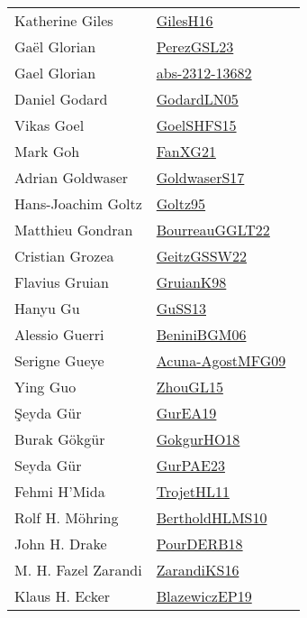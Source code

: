 {\begin{longtable}{p{4cm}p{20cm}}
Katherine Giles & \href{papers/GilesH16.pdf}{GilesH16}~\cite{GilesH16}\\
Ga{\"{e}}l Glorian & \href{papers/PerezGSL23.pdf}{PerezGSL23}~\cite{PerezGSL23}\\
Gael Glorian & \href{articles/abs-2312-13682.pdf}{abs-2312-13682}~\cite{abs-2312-13682}\\
Daniel Godard & \href{}{GodardLN05}~\cite{GodardLN05}\\
Vikas Goel & \href{articles/GoelSHFS15.pdf}{GoelSHFS15}~\cite{GoelSHFS15}\\
Mark Goh & \href{articles/FanXG21.pdf}{FanXG21}~\cite{FanXG21}\\
Adrian Goldwaser & \href{papers/GoldwaserS17.pdf}{GoldwaserS17}~\cite{GoldwaserS17}\\
Hans{-}Joachim Goltz & \href{papers/Goltz95.pdf}{Goltz95}~\cite{Goltz95}\\
Matthieu Gondran & \href{articles/BourreauGGLT22.pdf}{BourreauGGLT22}~\cite{BourreauGGLT22}\\
Cristian Grozea & \href{papers/GeitzGSSW22.pdf}{GeitzGSSW22}~\cite{GeitzGSSW22}\\
Flavius Gruian & \href{papers/GruianK98.pdf}{GruianK98}~\cite{GruianK98}\\
Hanyu Gu & \href{papers/GuSS13.pdf}{GuSS13}~\cite{GuSS13}\\
Alessio Guerri & \href{papers/BeniniBGM06.pdf}{BeniniBGM06}~\cite{BeniniBGM06}\\
Serigne Gueye & \href{papers/Acuna-AgostMFG09.pdf}{Acuna-AgostMFG09}~\cite{Acuna-AgostMFG09}\\
Ying Guo & \href{papers/ZhouGL15.pdf}{ZhouGL15}~\cite{ZhouGL15}\\
Şeyda G{\"u}r & \href{articles/GurEA19.pdf}{GurEA19}~\cite{GurEA19}\\
Burak G{\"{o}}kg{\"{u}}r & \href{}{GokgurHO18}~\cite{GokgurHO18}\\
Seyda G{\"{u}}r & \href{articles/GurPAE23.pdf}{GurPAE23}~\cite{GurPAE23}\\
Fehmi H'Mida & \href{articles/TrojetHL11.pdf}{TrojetHL11}~\cite{TrojetHL11}\\
Rolf H. M{\"{o}}hring & \href{papers/BertholdHLMS10.pdf}{BertholdHLMS10}~\cite{BertholdHLMS10}\\
John H. Drake & \href{articles/PourDERB18.pdf}{PourDERB18}~\cite{PourDERB18}\\
M. H. Fazel Zarandi & \href{articles/ZarandiKS16.pdf}{ZarandiKS16}~\cite{ZarandiKS16}\\
Klaus H. Ecker & \href{}{BlazewiczEP19}~\cite{BlazewiczEP19}\\

\end{longtable}}
